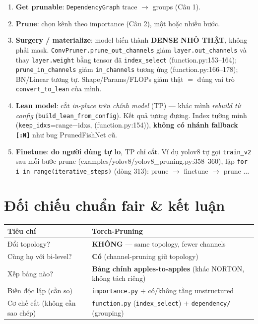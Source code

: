 \documentclass[11pt,a4paper]{article}
\newcommand{\code}[1]{\texttt{#1}}
\newcommand{\src}[1]{{\small\ttfamily(#1)}}   %
\begin{document}
\begin{enumerate}
  \item \textbf{Get prunable}: \code{DependencyGraph} trace \(\rightarrow\) groups (Câu 1).
  \item \textbf{Prune}: chọn kênh theo importance (Câu 2), một hoặc nhiều bước.
  \item \textbf{Surgery / materialize}: model biến thành \textbf{DENSE NHỎ THẬT}, không phải mask.
        \code{ConvPruner.prune\_out\_channels} giảm \code{layer.out\_channels} và thay
        \code{layer.weight} bằng tensor đã \code{index\_select} \src{function.py:153--164};
        \code{prune\_in\_channels} giảm \code{in\_channels} tương ứng \src{function.py:166--178};
        BN/Linear tương tự. Shape/Params/FLOPs giảm thật $=$ đúng vai trò
        \code{convert\_to\_lean} của mình.
  \item \textbf{Lean model}: cắt \emph{in-place trên chính model} (TP) --- khác mình
        \emph{rebuild từ config} (\code{build\_lean\_from\_config}). Kết quả tương đương.
        Index tường minh (\code{keep\_idxs}=range\(-\)idxs, \src{function.py:154}),
        \textbf{không có nhánh fallback \code{[:N]}} như bug PrunedFishNet cũ.
  \item \textbf{Finetune}: \textbf{do người dùng tự lo}, TP chỉ cắt. Ví dụ yolov8 tự gọi
        \code{train\_v2} sau mỗi bước prune \src{examples/yolov8/yolov8\_pruning.py:358--360}, lặp
        \code{for i in range(iterative\_steps)} \src{dòng 313}: prune \(\rightarrow\) finetune
        \(\rightarrow\) prune \(\ldots\)
\end{enumerate}

\section{Đối chiếu chuẩn fair \& kết luận}

\begin{center}
\begin{tabular}{@{}p{5.2cm}p{7.2cm}@{}}
\hline
\textbf{Tiêu chí} & \textbf{Torch-Pruning}\\
\hline
Đổi topology? & \textbf{KHÔNG} --- same topology, fewer channels\\
Cùng họ với bi-level? & \textbf{Có} (channel-pruning giữ topology)\\
Xếp bảng nào? & \textbf{Bảng chính apples-to-apples} (khác NORTON, không tách riêng)\\
Biến độc lập (cần so) & \code{importance.py} $+$ có/không tầng unstructured\\
Cơ chế cắt (không cần sao chép) & \code{function.py} (\code{index\_select}) $+$ \code{dependency/} (grouping)\\
\hline
\end{tabular}
\end{center}
\end{document}
